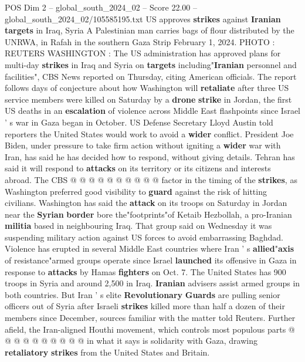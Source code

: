 \begin{textsample}{POS Dim 2 – global\_south\_2024\_02 – Score 22.00 – global\_south\_2024\_02/105585195.txt}  \label{ex:f2_pos_191}
US approves \textbf{strikes} against \textbf{Iranian} \textbf{targets} in Iraq, Syria A Palestinian man carries bags of flour distributed by the UNRWA, in Rafah in the southern Gaza Strip February 1, 2024.
PHOTO : REUTERS WASHINGTON : The US administration has approved plans for multi-day \textbf{strikes} in Iraq and Syria on \textbf{targets} including"\textbf{Iranian} personnel and facilities", CBS News reported on Thursday, citing American officials.
The report follows days of conjecture about how Washington will \textbf{retaliate} after three US service members were killed on Saturday by a \textbf{drone} \textbf{strike} in Jordan, the first US deaths in an \textbf{escalation} of violence across Middle East flashpoints since Israel ' s war in Gaza began in October.
US Defense Secretary Lloyd Austin told reporters the United States would work to avoid a \textbf{wider} conflict.
President Joe Biden, under pressure to take firm action without igniting a \textbf{wider} war with Iran, has said he has decided how to respond, without giving details.
Tehran has said it will respond to \textbf{attacks} on its territory or its citizens and interests abroad.
The CBS @ @ @ @ @ @ @ @ @ @ factor in the timing of the \textbf{strikes}, as Washington preferred good visibility to \textbf{guard} against the risk of hitting civilians.
Washington has said the \textbf{attack} on its troops on Saturday in Jordan near the \textbf{Syrian} \textbf{border} bore the"footprints"of Ketaib Hezbollah, a pro-Iranian \textbf{militia} based in neighbouring Iraq.
That group said on Wednesday it was suspending military action against US forces to avoid embarrassing Baghdad.
Violence has erupted in several Middle East countries where Iran ' s \textbf{allied}"\textbf{axis} of resistance"armed groups operate since Israel \textbf{launched} its offensive in Gaza in response to \textbf{attacks} by Hamas \textbf{fighters} on Oct. 7.
The United States has 900 troops in Syria and around 2,500 in Iraq. \textbf{Iranian} advisers assist armed groups in both countries.
But Iran ' s elite \textbf{Revolutionary} \textbf{Guards} are pulling senior officers out of Syria after Israeli \textbf{strikes} killed more than half a dozen of their members since December, sources familiar with the matter told Reuters.
Further afield, the Iran-aligned Houthi movement, which controls most populous parts @ @ @ @ @ @ @ @ @ @ in what it says is solidarity with Gaza, drawing \textbf{retaliatory} \textbf{strikes} from the United States and Britain.

\end{textsample}
